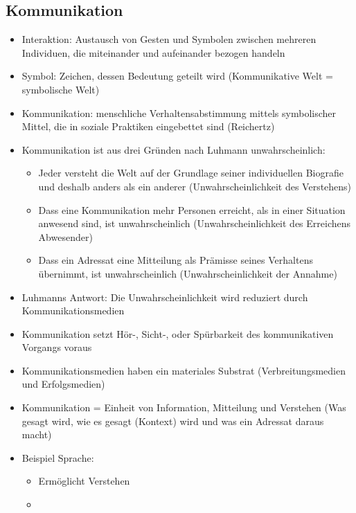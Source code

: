 \documentclass{scrartcl}
\begin{document}
\subsection*{Kommunikation}
\begin{itemize}
    \item
        Interaktion: Austausch von Gesten und Symbolen zwischen mehreren Individuen, die miteinander und aufeinander bezogen handeln
    \item
        Symbol: Zeichen, dessen Bedeutung geteilt wird (Kommunikative Welt = symbolische Welt)
    \item
        Kommunikation: menschliche Verhaltensabstimmung mittels symbolischer Mittel, die in soziale Praktiken eingebettet sind (Reichertz)\\
    \item
        Kommunikation ist aus drei Gründen nach Luhmann unwahrscheinlich:
        \begin{itemize}
            \item
                Jeder versteht die Welt auf der Grundlage seiner individuellen Biografie und deshalb anders als ein anderer (Unwahrscheinlichkeit des Verstehens)
            \item
                Dass eine Kommunikation mehr Personen erreicht, als in einer Situation anwesend sind, ist unwahrscheinlich (Unwahrscheinlichkeit des Erreichens Abwesender)
            \item
                Dass ein Adressat eine Mitteilung als Prämisse seines Verhaltens übernimmt, ist unwahrscheinlich (Unwahrscheinlichkeit der Annahme)
        \end{itemize}
    \item
        Luhmanns Antwort: Die Unwahrscheinlichkeit wird reduziert durch Kommunikationsmedien
    \item
        Kommunikation setzt Hör-, Sicht-, oder Spürbarkeit des kommunikativen Vorgangs voraus
    \item
        Kommunikationsmedien haben ein materiales Substrat (Verbreitungsmedien und Erfolgsmedien)
    \item
        Kommunikation = Einheit von Information, Mitteilung und Verstehen (Was gesagt wird, wie es gesagt (Kontext) wird und was ein Adressat daraus macht)
    \item
        Beispiel Sprache:
        \begin{itemize}
            \item
                Ermöglicht Verstehen
            \item

\end{itemize}
\end{itemize}
\end{document}
